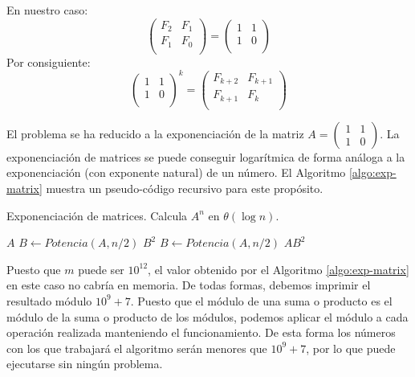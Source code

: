 \documentclass{article}
\theoremstyle{theorem-style}  %
\theoremstyle{definition}
\theoremstyle{example-style}
\begin{document}
    En nuestro caso:
    \begin{equation}
        \begin{pmatrix}
            F_{2} & F_{1} \\
            F_{1} & F_{0} \\
        \end{pmatrix}
        =
        \begin{pmatrix}
            1 & 1 \\
            1 & 0 \\
        \end{pmatrix}        
    \end{equation}
    Por consiguiente:
    \begin{equation}
        \begin{pmatrix}
            1 & 1 \\
            1 & 0 \\
        \end{pmatrix}^k
        =
        \begin{pmatrix}
            F_{k+2} & F_{k+1} \\
            F_{k+1} & F_{k} \\
        \end{pmatrix}        
    \end{equation}
    
    El problema se ha reducido a la exponenciación de la matriz $A =
    \begin{pmatrix} 
        1 & 1 \\ 
        1 & 0 
    \end{pmatrix}$. La exponenciación de matrices se puede conseguir logarítmica de forma análoga a la exponenciación (con exponente natural) de un número. El Algoritmo \ref{algo:exp-matrix} muestra un pseudo-código recursivo para este propósito.
    
    \begin{algorithm}
        \caption{Exponenciación de matrices. Calcula $A^n$ en $\theta(\log n)$.}
        \label{algo:exp-matrix}
        \begin{algorithmic}
                    \Return $A$
                    \State $B \gets Potencia(A,n/2)$
                    \State \Return $B^2$
                \Else
                    \State $B \gets Potencia(A,n/2)$
                    \State \Return $A B^2$                    
                \EndIf
            \EndFunction
        \end{algorithmic}
    \end{algorithm}

    Puesto que $m$ puede ser $10^{12}$, el valor obtenido por el Algoritmo \ref{algo:exp-matrix} en este caso no cabría en memoria. De todas formas, debemos imprimir el resultado módulo $10^9+7$. Puesto que el módulo de una suma o producto es el módulo de la suma o producto de los módulos, podemos aplicar el módulo a cada operación realizada manteniendo el funcionamiento. De esta forma los números con los que trabajará el algoritmo serán menores que $10^9+7$, por lo que puede ejecutarse sin ningún problema.
\end{document}
